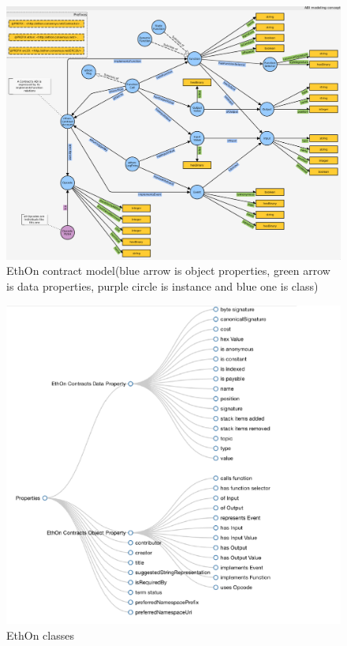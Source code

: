 \begin{center}
	
	\begin{figure}[htb!]
		
		\begin{minipage}{0.50\linewidth}
			\centering
			\includegraphics[width=1.80\textwidth]{images/chap2_EthOnContract.png}
		\end{minipage}
		\caption[EthOn classes]{EthOn contract model(blue arrow is object properties, green arrow is data properties, purple circle is instance and blue one is class)\cite{Rashid}}
		
	\end{figure}
	
	\begin{figure}[htb!]
		
		\begin{minipage}{0.55\linewidth}
			\centering
			\includegraphics[width=1.65\textwidth]{images/chap02_EthOn_Properties.png}
		\end{minipage}
		\caption[EthOn Properties]{EthOn classes\cite{Rashid}}
		

\end{figure}
\end{center}
